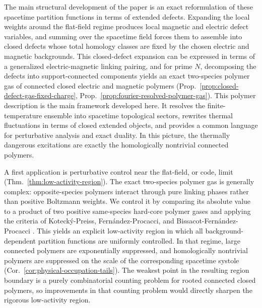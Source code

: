 The main structural development of the paper is an exact reformulation of these
spacetime partition functions in terms of extended defects. Expanding the local weights
around the flat-field regime produces local magnetic and electric defect
variables, and summing over the spacetime field forces them to assemble into
closed defects whose total homology classes are fixed by the chosen electric and
magnetic backgrounds. This closed-defect expansion can be
expressed in terms of a generalized electric-magnetic linking pairing, and for prime $N$,
decomposing the defects into support-connected components yields an exact
two-species polymer gas of connected closed electric and magnetic polymers
(Prop.~\ref{prop:closed-defect-gas-fixed-charge},
Prop.~\ref{prop:fourier-resolved-polymer-gas}). This polymer description is the
main framework developed here. It resolves the finite-temperature ensemble into
spacetime topological sectors, rewrites thermal fluctuations in terms of closed
extended objects, and provides a common language for perturbative analysis and
exact duality. In this picture, the thermally dangerous excitations are exactly
the homologically nontrivial connected polymers.

A first application is perturbative control near the flat-field, or code, limit
(Thm.~\ref{thm:low-activity-region}). The exact two-species polymer gas is
generally complex: opposite-species polymers interact through pure linking
phases rather than positive Boltzmann weights. We control it by comparing its
absolute value to a product of two positive same-species hard-core polymer gases
and applying the criteria of Koteck\'y-Preiss,
Fern\'andez-Procacci, and Bissacot-Fern\'andez-Procacci
\cite{KoteckyPreiss1986,FernandezProcacci2007,
	BissacotFernandezProcacci2010,Ueltschi2004}. This yields an explicit
low-activity region in which all background-dependent partition functions are
uniformly controlled. In that regime, large connected polymers are
exponentially suppressed, and homologically nontrivial polymers are suppressed
on the scale of the corresponding spacetime systole
(Cor.~\ref{cor:physical-occupation-tails}). The weakest point in the resulting
region boundary is a purely combinatorial counting problem for rooted connected closed
polymers, so improvements in that counting problem would directly sharpen the
rigorous low-activity region.

